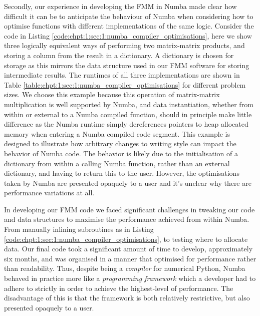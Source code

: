 Secondly, our experience in developing the FMM in Numba made clear how difficult it can be to anticipate the behaviour of Numba when considering how to optimise functions with different implementations of the same logic. Consider the code in Listing \ref{code:chpt:1:sec:1:numba_compiler_optimisations}, here we show three logically equivalent ways of performing two matrix-matrix products, and storing a column from the result in a dictionary. A dictionary is chosen for storage as this mirrors the data structure used in our FMM software for storing intermediate results. The runtimes of all three implementations are shown in Table \ref{table:chpt:1:sec:1:numba_compiler_optimisations} for different problem sizes. We choose this example because this operation of matrix-matrix multiplication is well supported by Numba, and data instantiation, whether from within or external to a Numba compiled function, should in principle make little difference as the Numba runtime simply dereferences pointers to heap allocated memory when entering a Numba compiled code segment. This example is designed to illustrate how arbitrary changes to writing style can impact the behavior of Numba code. The behavior is likely due to the initialisation of a dictionary from within a calling Numba function, rather than an external dictionary, and having to return this to the user. However, the optimisations taken by Numba are presented opaquely to a user and it's unclear why there are performance variations at all.

In developing our FMM code we faced significant challenges in tweaking our code and data structures to maximise the performance achieved from within Numba. From manually inlining subroutines as in Listing \ref{code:chpt:1:sec:1:numba_compiler_optimisations}, to testing where to allocate data. Our final code took a significant amount of time to develop, approximately six months, and was organised in a manner that optimised for performance rather than readability. Thus, despite being a \textit{compiler} for numerical Python, Numba behaved in practice more like a \textit{programming framework} which a developer had to adhere to strictly in order to achieve the highest-level of performance. The disadvantage of this is that the framework is both relatively restrictive, but also presented opaquely to a user.

